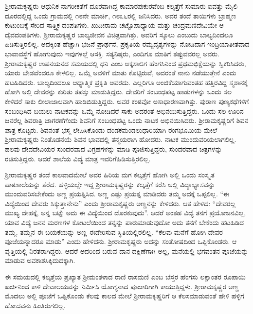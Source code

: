 ಶ‍್ರೀರಾಮಕೃಷ್ಣರು ಆಧುನಿಕ ನಾಗರೀಕತೆಗೆ ದೂರವಾಗಿದ್ದ ಕಾಮಾರಪುಕುರವೆಂಬ ಕಲ್ಕತ್ತೆಗೆ ಸುಮಾರು ಐವತ್ತು ಮೈಲಿ ದೂರದಲ್ಲಿದ್ದ ಒಂದು ಗ್ರಾಮದಲ್ಲಿ ೧೮ನೇ ಮಾರ್ಚಿ, ೧೮೩೬ರಲ್ಲಿ ಜನಿಸಿದರು. ಅವರ ತಂದೆ ತಾಯಿಗಳು ಬ್ರಾಹ್ಮಣ ಕುಟುಂಬಕ್ಕೆ ಸೇರಿದ ಸಾತ್ತ್ವಿಕ ದಂಪತಿಗಳು. ಖುದೀರಾಮ ಚಟ್ಟೊಪಾಧ್ಯಾಯ ಮತ್ತು ಚಂದ್ರಮಣಿದೇವಿಯೇ ಆ ದೈವದಂಪತಿಗಳು. ಶ‍್ರೀರಾಮಕೃಷ್ಣರ ಬಾಲ್ಯಜೀವನ ವಿಚಿತ್ರವಾಗಿತ್ತು. ಅವರಿಗೆ ಸ್ಕೂಲು ಎಂಬುದು ಬಾಲ್ಯದಿಂದಲೂ ಹಿಡಿಸುತ್ತಿರಲಿಲ್ಲ. ಅದಕ್ಕಿಂತ ಹೆಚ್ಚಾಗಿ ಭಜನೆ ಪ್ರಾರ್ಥನೆ, ಪ್ರಕೃತಿಯ ರಮ್ಯದೃಶ್ಯಗಳನ್ನು ನೋಡಿದಾಗ ಇಂದ್ರಿಯಾತೀತವಾದ ಭಾವಾವಸ್ಥೆಗೆ ಹೋಗುವುದು ಇವುಗಳಲ್ಲೆ ಆಸಕ್ತಿ. ಸತ್ಯನಿಷ್ಠರು, ಎಂದಿಗೂ ಮಾತಿಗೆ ತಪ್ಪುವವರಲ್ಲ ಅವರು. ಶ‍್ರೀರಾಮಕೃಷ್ಣರ ಉಪನಯನದ ಸಮಯದಲ್ಲಿ ಧನಿ ಎಂಬ ಅಕ್ಕಸಾಲಿಗ ಹೆಂಗಸಿನಿಂದ ಪ್ರಥಮಭಿಕ್ಷೆಯನ್ನು ಸ್ವಿಕರಿಸಿದರು, ಯಾರು ಬೇಡವೆಂದರೂ ಕೇಳಲಿಲ್ಲ. ಒಮ್ಮೆ ಅವಳಿಗೆ ಮಾತು ಕೊಟ್ಟಿರುವೆ, ಅದರಂತೆ ನಾನು ನಡೆಯುತ್ತೇನೆ ಎಂದು ಹಟಹಿಡಿದರು. ಬಾಲ್ಯದಿಂದಲೂ ಆಧ್ಯಾತ್ಮಿಕ ಪ್ರಕೃತಿ ಅವರದು. ಎಲ್ಲರಿಗೂ ಅಂಜಿಕೆಯಾಗುವಂತಹ ಹತ್ತಿರವಿದ್ದ ಸ್ಮಶಾನಕ್ಕೆ ಹೋಗಿ ಅಲ್ಲಿ ದೇವರನ್ನು ಕುರಿತು ತಪಸ್ಸು ಮಾಡುತ್ತಿದ್ದರು. ದೇವರಿಗೆ ಸಂಬಂಧಪಟ್ಟ ಹಾಡುಗಳನ್ನು ಒಂದು ಸಲ ಕೇಳಿದರೆ ಸಾಕು ಲೀಲಾಜಾಲವಾಗಿ ಹಾಡಿಬಿಡುತ್ತಿದ್ದರು. ಅವರ ಕಂಠವೋ ಅಸಾಧಾರಣವಾಗಿತ್ತು. ಪುರಾಣ ಪುಣ್ಯಕಥೆಗಳಿಗೆ ಸಂಬಂಧಿಸಿದ ಬಯಲು ನಾಟಕವನ್ನು ಒಮ್ಮೆ ನೋಡಿದರೆ ಸಾಕು ಅದರಂತೆ ಅಭಿನಯಿಸುತ್ತಿದ್ದರು. ಒಂದು ಸಲ ಊರಿನ ಜನರೆಲ್ಲ ಶಿವರಾತ್ರಿ ಜಾಗರಣೆಗೆಂದು ಶಿವನಿಗೆ ಸಂಬಂಧಪಟ್ಟ ಒಂದು ನಾಟಕ ಅಭಿನಯಿಸಿದರು. ಶ‍್ರೀರಾಮಕೃಷ್ಣರಿಗೆ ಶಿವನ ಪಾತ್ರ ಕೊಟ್ಟರು. ಶಿವನಂತೆ ಭಸ್ಮ ಲೇಪಿಸಿಕೊಂಡು ದಂಡಕಮಂಡಲುಧಾರಿಯಾಗಿ ರಂಗಭೂಮಿಯ ಮೇಲೆ ಶ‍್ರೀರಾಮಕೃಷ್ಣರು ನಿಂತೊಡನೆಯೆ ಶಿವನ ಭಾವದಲ್ಲಿ ತನ್ಮಯರಾಗಿ ಹೋದರು. ನಾಟಕ ಮುಂದುವರಿಯಲಾಗಲಿಲ್ಲ. ಹಲವು ದೇವದೇವಿಯರ ಸುಂದರವಾದ ವಿಗ್ರಹಗಳನ್ನು ಮಾಡಿ ಪೂಜಿಸುತ್ತಿದ್ದರು, ಸುಂದರವಾದ ಚಿತ್ರಗಳನ್ನು ರಚಿಸುತ್ತಿದ್ದರು. ಆದರೆ ಶಾಲೆಯ ವಿದ್ಯೆ ಮಾತ್ರ ಇವರಿಗೆ\break ಹಿಡಿಸುತ್ತಿರಲಿಲ್ಲ.

ಶ‍್ರೀರಾಮಕೃಷ್ಣರ ತಂದೆ ಕಾಲವಾದಮೇಲೆ ಅವರ ಹಿರಿಯ ಮಗ ಕಲ್ಕತ್ತೆಗೆ ಹೋಗಿ ಅಲ್ಲಿ ಒಂದು ಸಂಸ್ಕೃತ ಪಾಠಶಾಲೆಯನ್ನು ತೆರೆದ. ಹಳ್ಳಿಯಲ್ಲೇ ಇದ್ದ ಶ‍್ರೀರಾಮಕೃಷ್ಣರನ್ನು ಕಲ್ಕತ್ತೆಗೆ ಕರೆಸಿ ಅಲ್ಲಿ ವಿದ್ಯಾಭ್ಯಾಸವನ್ನು ಮುಂದುವರಿಸಬೇಕೆಂದು ಅಣ್ಣ ಪ್ರಯತ್ನಿಸಿದ. ಅಣ್ಣ ಎಷ್ಟು ಪ್ರಯತ್ನ ಮಾಡಿದರು ತಮ್ಮ ಅದಕ್ಕೆ ಒಪ್ಪಲಿಲ್ಲ. “ಈ ವಿದ್ಯೆಯಿಂದ ದೇವರು ಸಿಕ್ಕುತ್ತಾನೇನು” ಎಂದು ಶ‍್ರೀರಾಮಕೃಷ್ಣರು ಅಣ್ಣನನ್ನು ಕೇಳಿದರು. ಆತ ಹೇಳಿದ: “ದೇವರಲ್ಲ ಮುಖ್ಯ ದೇಹಕ್ಕೆ, ಅನ್ನ ಬಟ್ಟೆ; ಅದು ಈ ವಿದ್ಯೆಯಿಂದ ದೊರಕುವುದು”. ಆದರೆ ಅಂತಹ ವಿದ್ಯೆ ತನಗೆ ಪ್ರಯೋಜನವಿಲ್ಲ, ಯಾವ ವಿದ್ಯೆ ಜನನ ಮರಣಗಳ ಕೋಟಲೆಯಿಂದ ತನ್ನನ್ನು ಪಾರುಮಾಡುವುದೋ ಅದು ತನಗೆ ಬೇಕೆಂದು ಹಟಹಿಡಿದ ತಮ್ಮ. ತಮ್ಮನ ಈ ಬಯಕೆಯನ್ನು ಅಣ್ಣ ಈಡೇರಿಸುವ ಸ್ಥಿತಿಯಲ್ಲಿರಲಿಲ್ಲ. “ಕೆಲವು ಮನೆಗೆ ಹೋಗಿ ದೇವರ ಪೂಜೆಯನ್ನಾದರೂ ಮಾಡು” ಎಂದು ಹೇಳಿದನು. ಶ‍್ರೀರಾಮಕೃಷ್ಣರು ಅದನ್ನು ಸಂತೋಷದಿಂದ ಒಪ್ಪಿಕೊಂಡರು. ಆ ವೃತ್ತಿಯಲ್ಲಿ ನಿರತರಾಗಿದ್ದರು. ಆದರೆ ಅದರಿಂದ ಬರುವ ದಾನ ದಕ್ಷಿಣೆಗಾಗಿ ಅಲ್ಲ, ಮನೆಯಲ್ಲಿ ಭಗವಂತನ ಪೂಜೆಯನ್ನು ಮಾಡುವ ಅವಕಾಶ\break ಸಿಕ್ಕಿದುದಕ್ಕಾಗಿ.

ಈ ಸಮಯದಲ್ಲಿ ಕಲ್ಕತ್ತೆಯ ಪ್ರಖ್ಯಾತ ಶ‍್ರೀಮಂತಳಾದ ರಾಣಿ ರಾಸಮಣಿ ಎಂಬ ಬೆಸ್ತರ ಹೆಂಗಸು ಲಕ್ಷಾಂತರ ರೂಪಾಯಿ ಖರ್ಚಿನಿಂದ ಕಾಳಿ ದೇವಾಲಯವನ್ನು ನಿರ್ಮಿಸಿ ಯೋಗ್ಯನಾದ ಪೂಜಾರಿಗಾಗಿ ಕಾಯುತ್ತಿದ್ದಳು. ಶ‍್ರೀರಾಮಕೃಷ್ಣರ ಅಣ್ಣ ಮೊದಲು ಅಲ್ಲಿ ಪೂಜೆಗೆ ಒಪ್ಪಿಕೊಂಡು ಕೆಲವು ಕಾಲದ ಮೇಲೆ ಶ‍್ರೀರಾಮಕೃಷ್ಣರಿಗೆ ಆ ಕೆಲಸಮಾಡುವಂತೆ ಹೇಳಿ ಹಳ್ಳಿಗೆ ಹೋದವನು ಹಿಂತಿರುಗಲಿಲ್ಲ.

